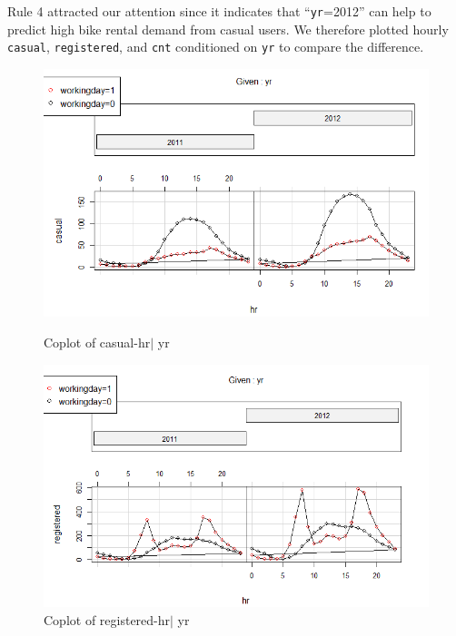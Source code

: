 \documentclass[12pt]{article}
\begin{document}
	Rule 4 attracted our attention since it indicates that ``\texttt{yr}=2012'' can help to predict high bike rental demand from casual users. We therefore plotted hourly \texttt{casual}, \texttt{registered}, and \texttt{cnt} conditioned on \texttt{yr} to compare the difference. 
	
	\begin{figure}[H]
		\centering
		\begin{minipage}{.48\textwidth}
			\centering
			\includegraphics[width=\linewidth]{figures/casual_yr.png}
			\caption{Coplot of casual-hr$|$ yr}
		\end{minipage}%
		\begin{minipage}{.48\textwidth}
			\centering
			\includegraphics[width=\linewidth]{figures/registered_yr.png}
			\caption{Coplot of registered-hr$|$ yr}
		\end{minipage}
	\end{figure}
	
\end{document}
